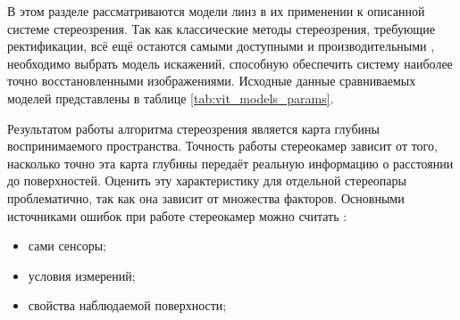 
В этом разделе рассматриваются модели линз в их применении к описанной системе стереозрения. 
Так как классические методы стереозрения, требующие ректификации, всё ещё остаются самыми доступными и производительными \cite{disparity_review}, 
необходимо выбрать модель искажений, способную обеспечить систему наиболее точно восстановленными изображениями. 
Исходные данные сравниваемых моделей представлены в таблице \ref{tab:vit_models_params}.

\begin{table}[h!]
    
    \caption{Результаты калибровки}
    \label{tab:vit_models_params}
\end{table}

Результатом работы алгоритма стереозрения является карта глубины воспринимаемого пространства.  Точность работы 
стереокамер зависит от того, насколько точно эта карта глубины передаёт реальную информацию о расстоянии до поверхностей.
Оценить эту характеристику для отдельной стереопары проблематично, так как она зависит от множества факторов. Основными источниками
 ошибок при работе стереокамер можно считать \cite{kinect_perf}: 
\begin{itemize}
    \item сами сенсоры;
    \item условия измерений;
    \item свойства наблюдаемой поверхности;
\end{itemize}


